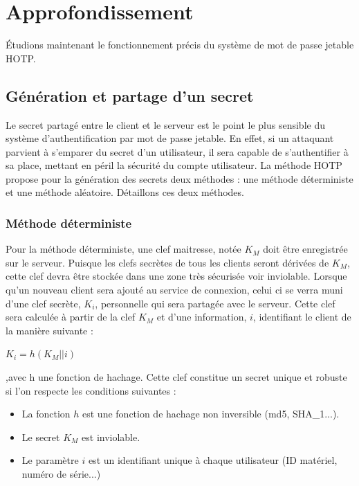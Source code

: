 \documentclass{../res/univ-projet}
\begin{document}
\section{Approfondissement}
  Étudions maintenant le fonctionnement précis du système de mot de passe jetable \og{}HOTP\fg{}.
  \subsection{Génération et partage d'un secret}
    Le secret partagé entre le client et le serveur est le point le plus sensible du système d'authentification par mot de passe jetable. En effet, si un attaquant 
    parvient à s'emparer du secret d'un utilisateur, il sera capable de s'authentifier à sa place, mettant en péril la sécurité du compte utilisateur. La méthode 
    \og{}HOTP\fg{} propose pour la génération des secrets deux méthodes : une méthode déterministe et une méthode aléatoire. Détaillons ces deux méthodes.
    
    \subsubsection{Méthode déterministe}
    Pour la méthode déterministe, une clef maitresse, notée $K_M$ doit être enregistrée sur le serveur. Puisque les clefs secrètes de tous les clients seront dérivées 
    de $K_M$, cette clef devra être stockée dans une zone très sécurisée voir inviolable. Lorsque qu'un nouveau client sera ajouté au service de connexion, celui ci
    se verra muni d'une clef secrète, $K_i$, personnelle qui sera partagée avec le serveur. Cette clef sera calculée à partir de la clef $K_M$ et d'une information, $i$, 
    identifiant le client de la manière suivante : \newline
    \begin{center}
     $K_i = h(K_M || i)$ 
    \end{center}
    \hfill{},avec h une fonction de hachage.\newline
    Cette clef constitue un secret unique et robuste si l'on respecte les conditions suivantes :
    \begin{itemize}
     \item La fonction $h$ est une fonction de hachage non inversible (md5, SHA\_1...).
     \item Le secret $K_M$ est inviolable.
     \item Le paramètre $i$ est un identifiant unique à chaque utilisateur (ID matériel, numéro de série...)
    \end{itemize}
    
\end{document}
